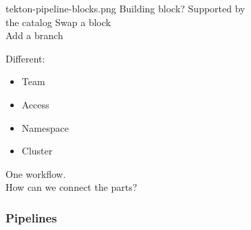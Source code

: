 \documentclass[aspectratio=169,11pt,hyperref={colorlinks=true}]{beamer}
\begin{document}
\begin{grayframe}
\begin{textblock*}{0.3\paperwidth}
  \end{textblock*}
\end{grayframe}

\begin{tpicstripedframe}%
  {tekton-pipeline-blocks.png}%
  {%
  Building block?
  \vspace{0.03\paperheight}
  Supported by \\the catalog
  }%
  {%
  Swap a block \\
  \vspace{0.03\paperheight}
  Add a branch
  }%
  {%
  Different:
  \begin{itemize}
    \item Team
    \item Access
    \item Namespace
    \item Cluster
  \end{itemize}
  }%
  {%
  One workflow. \\
  \vspace{0.03\paperheight}
  How can we connect the parts?
  }%
  \frametitle{Pipelines}
\end{tpicstripedframe}
\end{document}
